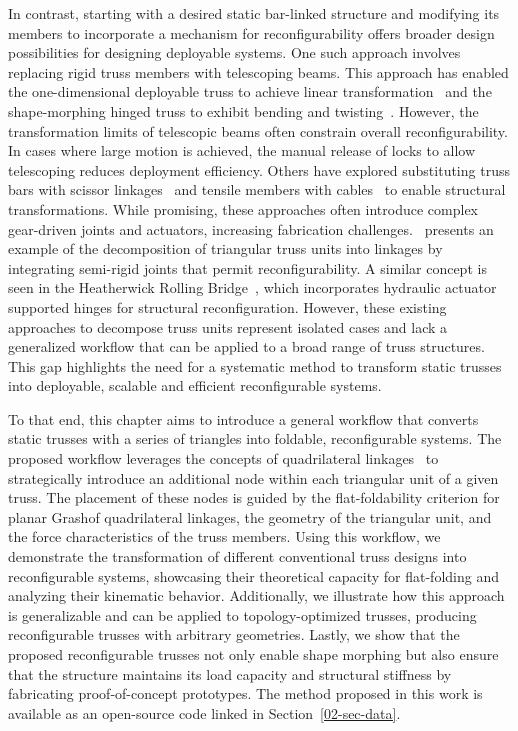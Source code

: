 In contrast, starting with a desired static bar-linked structure and modifying its members to incorporate a mechanism for reconfigurability offers broader design possibilities for designing deployable systems. One such approach involves replacing rigid truss members with telescoping beams. This approach has enabled the one-dimensional deployable truss to achieve linear transformation~\citep{miura1984design} and the shape-morphing hinged truss to exhibit bending and twisting~\citep{sofla2009shape}. However, the transformation limits of telescopic beams often constrain overall reconfigurability. In cases where large motion is achieved, the manual release of locks to allow telescoping reduces deployment efficiency. Others have explored substituting truss bars with scissor linkages~\citep{wang2015design} and tensile members with cables~\citep{giersch2010deployment} to enable structural transformations. While promising, these approaches often introduce complex gear-driven joints and actuators, increasing fabrication challenges.~\cite{yao2023dynamic} presents an example of the decomposition of triangular truss units into linkages by integrating semi-rigid joints that permit reconfigurability. A similar concept is seen in the Heatherwick Rolling Bridge~\citep{studio2002rolling, packman2005rolling}, which incorporates hydraulic actuator supported hinges for structural reconfiguration. However, these existing approaches to decompose truss units represent isolated cases and lack a generalized workflow that can be applied to a broad range of truss structures. This gap highlights the need for a systematic method to transform static trusses into deployable, scalable and efficient reconfigurable systems.

To that end, this chapter aims to introduce a general workflow that converts static trusses with a series of triangles into foldable, reconfigurable systems. The proposed workflow leverages the concepts of quadrilateral linkages~\citep{barker1985complete} to strategically introduce an additional node within each triangular unit of a given truss. The placement of these nodes is guided by the flat-foldability criterion for planar Grashof quadrilateral linkages, the geometry of the triangular unit, and the force characteristics of the truss members. Using this workflow, we demonstrate the transformation of different conventional truss designs into reconfigurable systems, showcasing their theoretical capacity for flat-folding and analyzing their kinematic behavior. Additionally, we illustrate how this approach is generalizable and can be applied to topology-optimized trusses, producing reconfigurable trusses with arbitrary geometries. Lastly, we show that the proposed reconfigurable trusses not only enable shape morphing but also ensure that the structure maintains its load capacity and structural stiffness by fabricating proof-of-concept prototypes. The method proposed in this work is available as an open-source code linked in Section~\ref{02-sec-data}.


